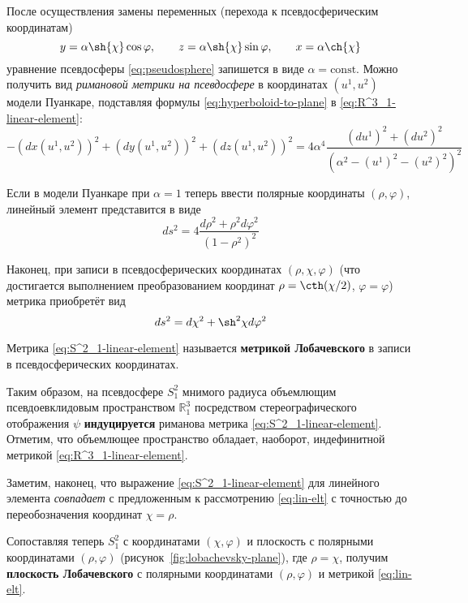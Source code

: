 \documentclass{article}
\numberwithin{equation}{section}
\renewcommand{\phi}{\varphi}
\newcommand{\neword}[1]{\textbf{#1}}
\begin{document}
После осуществления замены переменных (перехода к псевдосферическим
координатам)
\begin{equation*}\label{eq:pseudospheric-coords}
  y = \alpha \sh{\chi} \cos{\phi}, \qquad
  z = \alpha \sh{\chi} \sin{\phi}, \qquad
  x = \alpha \ch{\chi}
\end{equation*}
уравнение псевдосферы \eqref{eq:pseudosphere} запишется в виде $\alpha = \text{const}$. Можно
получить вид \emph{римановой метрики на псевдосфере} в координатах
$(u^1, u^2)$ модели Пуанкаре, подставляя формулы
\eqref{eq:hyperboloid-to-plane} в \eqref{eq:R^3_1-linear-element}:
\begin{equation*}
  -(dx(u^1, u^2))^2 + (dy(u^1, u^2))^2 + (dz(u^1, u^2))^2 =
  4\alpha^4\frac{(du^1)^2 + (du^2)^2}
                {\left (\alpha^2 - (u^1)^2-(u^2)^2 \right )^2}
\end{equation*}

Если в модели Пуанкаре при $\alpha=1$ теперь ввести полярные
координаты $(\rho, \phi)$, линейный элемент представится в виде
\begin{equation}\label{eq:poincare-lin-elt-polar}
  ds^2 = 4\frac{d\rho^2 + \rho^2 d\phi^2}{\left (1 - \rho^2 \right )^2}
\end{equation}

Наконец, при записи в псевдосферических координатах $(\rho, \chi, \phi)$
(что достигается выполнением преобразованием координат $\rho =
\cth(\chi/2)$, $\phi=\phi$) метрика приобретёт вид
\begin{equation}\label{eq:S^2_1-linear-element}
  ds^2 = d\chi^2 + \sh^2{\chi}d\phi^2
\end{equation}

Метрика \eqref{eq:S^2_1-linear-element} называется \neword{метрикой
  Лобачевского} в записи в псевдосферических координатах.

Таким образом, на псевдосфере $S^2_1$ мнимого радиуса объемлющим
псевдоевклидовым пространством $\mathbb{R}^3_1$ посредством
стереографического отображения $\psi$ \neword{индуцируется} риманова
метрика \eqref{eq:S^2_1-linear-element}. Отметим, что объемлющее
пространство обладает, наоборот, индефинитной метрикой
\eqref{eq:R^3_1-linear-element}.

Заметим, наконец, что выражение \eqref{eq:S^2_1-linear-element} для
линейного элемента \emph{совпадает} с предложенным к рассмотрению
\eqref{eq:lin-elt} с точностью до переобозначения координат $\chi =
\rho$.

Сопоставляя теперь $S^2_1$ с координатами $(\chi, \phi)$ и плоскость с
полярными координатами $(\rho, \phi)$
(рисунок \ref{fig:lobachevsky-plane}), где $\rho=\chi$, получим
\neword{плоскость Лобачевского} с полярными координатами $(\rho,
\phi)$ и метрикой \eqref{eq:lin-elt}.
\end{document}
